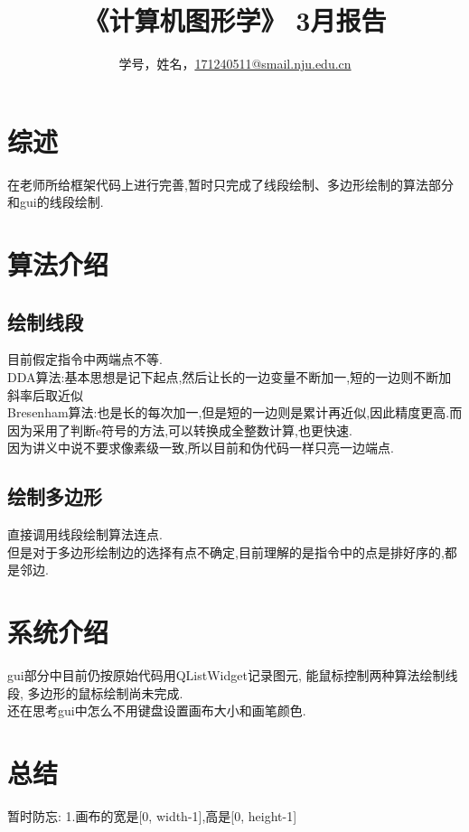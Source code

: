 \documentclass[a4paper,UTF8]{article}
\theoremstyle{definition}
\begin{document}
\title{\textbf{《计算机图形学》 3月报告 }}
\author{学号，姓名，\href{mailto:xxx@xxx.com}{171240511@smail.nju.edu.cn}}
\maketitle

\section{综述}
在老师所给框架代码上进行完善,暂时只完成了线段绘制、多边形绘制的算法部分和gui的线段绘制.

\section{算法介绍}
\subsection{绘制线段}
目前假定指令中两端点不等.\\
\indent DDA算法:基本思想是记下起点,然后让长的一边变量不断加一,短的一边则不断加斜率后取近似\cite{rog_2002}\\
\indent Bresenham算法:也是长的每次加一,但是短的一边则是累计再近似,因此精度更高.而因为采用了判断e符号的方法,可以转换成全整数计算,也更快速.\cite{rog_2002}\\
\indent 因为讲义中说不要求像素级一致,所以目前和伪代码一样只亮一边端点.
\subsection{绘制多边形}
直接调用线段绘制算法连点.\\
\indent 但是对于多边形绘制边的选择有点不确定,目前理解的是指令中的点是排好序的,都是邻边.
		
\section{系统介绍}
gui部分中目前仍按原始代码用QListWidget记录图元, 能鼠标控制两种算法绘制线段,
多边形的鼠标绘制尚未完成.\\
\indent 还在思考gui中怎么不用键盘设置画布大小和画笔颜色.

\section{总结}
暂时防忘:
\indent 1.画布的宽是[0, width-1],高是[0, height-1]

%

\end{document}

